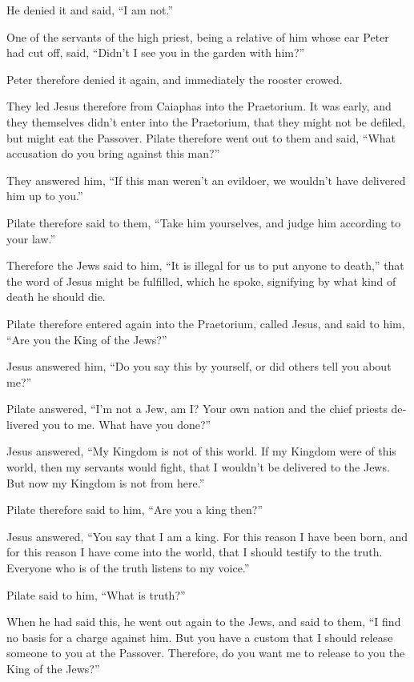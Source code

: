 \begin{paracol}{2}
\begin{otherlanguage}{english}
He denied it and said, ``I am not.''

 One of the servants of the high priest, being a relative
of him whose ear Peter had cut off, said, ``Didn't I see you in the
garden with him?''

 Peter therefore denied it again, and immediately the
rooster crowed.

 They led Jesus therefore from Caiaphas into the
Praetorium. It was early, and they themselves didn't enter into the
Praetorium, that they might not be defiled, but might eat the Passover.
 Pilate therefore went out to them and said, ``What
accusation do you bring against this man?''

 They answered him, ``If this man weren't an evildoer, we
wouldn't have delivered him up to you.''

 Pilate therefore said to them, ``Take him yourselves,
and judge him according to your law.''

Therefore the Jews said to him, ``It is illegal for us to put anyone to
death,''  that the word of Jesus might be fulfilled,
which he spoke, signifying by what kind of death he should die.

 Pilate therefore entered again into the Praetorium,
called Jesus, and said to him, ``Are you the King of the Jews?''

 Jesus answered him, ``Do you say this by yourself, or
did others tell you about me?''

 Pilate answered, ``I'm not a Jew, am I? Your own nation
and the chief priests delivered you to me. What have you done?''

 Jesus answered, ``My Kingdom is not of this world. If my
Kingdom were of this world, then my servants would fight, that I
wouldn't be delivered to the Jews. But now my Kingdom is not from
here.''

 Pilate therefore said to him, ``Are you a king then?''

Jesus answered, ``You say that I am a king. For this reason I have been
born, and for this reason I have come into the world, that I should
testify to the truth. Everyone who is of the truth listens to my
voice.''

 Pilate said to him, ``What is truth?''

When he had said this, he went out again to the Jews, and said to them,
``I find no basis for a charge against him.  But you have
a custom that I should release someone to you at the Passover.
Therefore, do you want me to release to you the King of the Jews?''


\end{otherlanguage}
\end{paracol}
